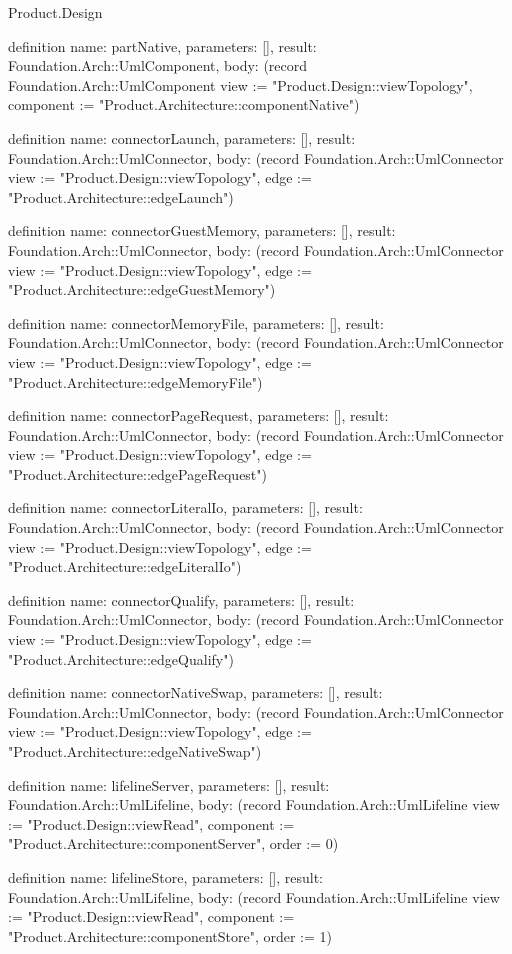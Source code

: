 \begin{lexlean}{Product.Design}
\begin{semanticmodule}
definition{
  name: partNative, parameters: [], result: Foundation.Arch::UmlComponent,
  body: (record Foundation.Arch::UmlComponent {view := "Product.Design::viewTopology", component := "Product.Architecture::componentNative"})
}

definition{
  name: connectorLaunch, parameters: [], result: Foundation.Arch::UmlConnector,
  body: (record Foundation.Arch::UmlConnector {view := "Product.Design::viewTopology", edge := "Product.Architecture::edgeLaunch"})
}

definition{
  name: connectorGuestMemory, parameters: [], result: Foundation.Arch::UmlConnector,
  body: (record Foundation.Arch::UmlConnector {view := "Product.Design::viewTopology", edge := "Product.Architecture::edgeGuestMemory"})
}

definition{
  name: connectorMemoryFile, parameters: [], result: Foundation.Arch::UmlConnector,
  body: (record Foundation.Arch::UmlConnector {view := "Product.Design::viewTopology", edge := "Product.Architecture::edgeMemoryFile"})
}

definition{
  name: connectorPageRequest, parameters: [], result: Foundation.Arch::UmlConnector,
  body: (record Foundation.Arch::UmlConnector {view := "Product.Design::viewTopology", edge := "Product.Architecture::edgePageRequest"})
}

definition{
  name: connectorLiteralIo, parameters: [], result: Foundation.Arch::UmlConnector,
  body: (record Foundation.Arch::UmlConnector {view := "Product.Design::viewTopology", edge := "Product.Architecture::edgeLiteralIo"})
}

definition{
  name: connectorQualify, parameters: [], result: Foundation.Arch::UmlConnector,
  body: (record Foundation.Arch::UmlConnector {view := "Product.Design::viewTopology", edge := "Product.Architecture::edgeQualify"})
}

definition{
  name: connectorNativeSwap, parameters: [], result: Foundation.Arch::UmlConnector,
  body: (record Foundation.Arch::UmlConnector {view := "Product.Design::viewTopology", edge := "Product.Architecture::edgeNativeSwap"})
}

definition{
  name: lifelineServer, parameters: [], result: Foundation.Arch::UmlLifeline,
  body: (record Foundation.Arch::UmlLifeline {view := "Product.Design::viewRead", component := "Product.Architecture::componentServer", order := 0})
}

definition{
  name: lifelineStore, parameters: [], result: Foundation.Arch::UmlLifeline,
  body: (record Foundation.Arch::UmlLifeline {view := "Product.Design::viewRead", component := "Product.Architecture::componentStore", order := 1})
}


\end{semanticmodule}
\end{lexlean}
